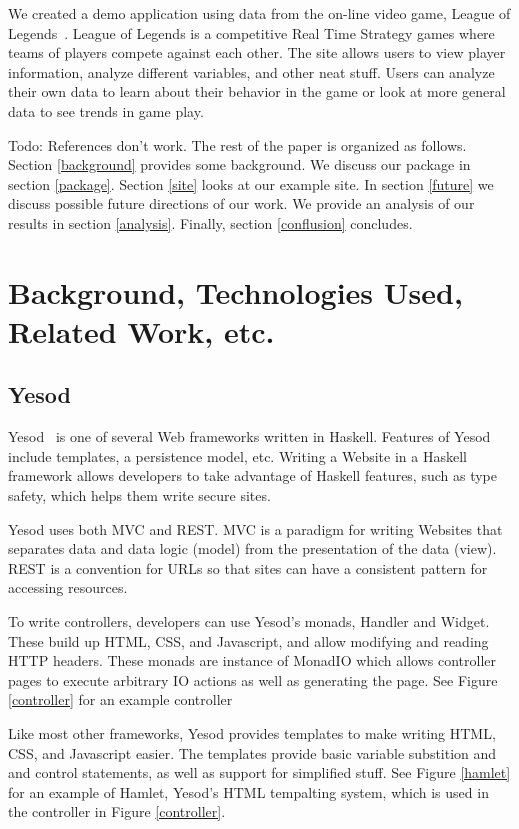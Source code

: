 \documentclass[letterpaper,twocolumn,9pt]{article}
\begin{document}
We created  a demo application using data from the on-line video game, League of Legends~\cite{lol}. League of Legends is a competitive Real Time Strategy games where teams of players compete against each other. The site allows users to view player information, analyze different variables, and other neat stuff. Users can analyze their own data to learn about their behavior in the game or look at more general data to see trends in game play. 

Todo: References don't work.
The rest of the paper is organized as follows. Section \ref{background} provides some background. We discuss our package in section \ref{package}. Section \ref{site} looks at our example site. In section \ref{future} we discuss possible future directions of our work. We provide an analysis of our results in section \ref{analysis}. Finally, section \ref{conflusion} concludes.

\section{Background, Technologies Used, Related Work, etc.}
\label{sec:background}

\subsection{Yesod}

Yesod~\cite{yesod} is one of several Web frameworks written in Haskell. Features of Yesod include templates, a persistence model, etc. Writing a Website in a Haskell framework allows developers to take advantage of Haskell features, such as type safety, which helps them write secure sites.

Yesod uses both MVC and REST. MVC is a paradigm for writing Websites that separates data and data logic (model) from the presentation of the data (view). REST is a convention for URLs so that sites can have a consistent pattern for accessing resources. 

To write controllers, developers can use Yesod's monads, Handler and Widget. These build up HTML, CSS, and Javascript, and allow modifying and reading HTTP headers. These monads are instance of MonadIO which allows controller pages to execute arbitrary IO actions as well as generating the page. See Figure \ref{controller} for an example controller 

Like most other frameworks, Yesod provides templates to make writing HTML, CSS, and Javascript easier. The templates provide basic variable substition and and control statements, as well as support for simplified stuff. See Figure \ref{hamlet} for an example of Hamlet, Yesod's HTML tempalting system, which is used in the controller in Figure \ref{controller}.
\end{document}
